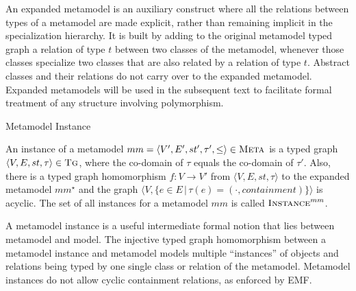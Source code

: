 


An expanded metamodel is an auxiliary construct where all the relations between types of a metamodel are made explicit, rather than remaining implicit in the specialization hierarchy. It is built by adding to the original metamodel typed graph a relation of type $t$ between two classes of the metamodel, whenever those classes specialize two classes that are also related by a relation of type $t$. Abstract classes and their relations do not carry over to the expanded metamodel. Expanded metamodels will be used in the subsequent text to facilitate formal treatment of any structure involving polymorphism.



\begin{definition}{Metamodel Instance\\}
\label{def:metamodelinstance}

An instance of a metamodel $mm = \langle V',E',st',\tau',\leq\rangle\in \textsc{Meta}$ is a typed graph $\langle V,E,st,\tau\rangle\in \textsc{Tg}$, where the co-domain of $\tau$ equals the co-domain of $\tau'$. Also, there is a typed graph homomorphism $f:V\rightarrow V'$ from $\langle V,E,st,\tau\rangle$ to the expanded metamodel $mm^{\star}$ and the graph $\big\langle V,\{e\in E\,|\,\tau(e)=(\cdot,containment)\}\big\rangle$ is acyclic. The set of all instances for a metamodel $mm$ is called $\textsc{Instance}^{mm}$.

\end{definition}



A metamodel instance is a useful intermediate formal notion that lies between metamodel and model. The injective typed graph homomorphism between a metamodel instance and metamodel models multiple ``instances'' of objects and relations being typed by one single class or relation of the metamodel. Metamodel instances do not allow cyclic containment relations, as enforced by EMF. 

